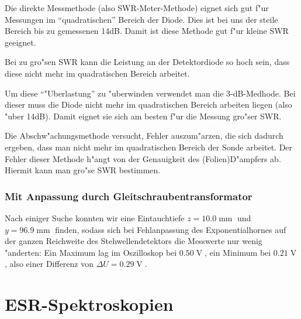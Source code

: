 \documentclass[a4paper,12pt]{article}
\begin{document}
Die direkte Messmethode (also SWR-Meter-Methode) eignet sich gut f"ur
Messungen im "`quadratischen"' Bereich der Diode. Dies ist bei uns der
steile Bereich bis zu gemessenen 14dB.
 Damit ist diese Methode gut
f"ur kleine SWR geeignet. 


Bei zu gro"sen SWR kann die Leistung an der Detektordiode so hoch
sein, dass diese nicht mehr im quadratischen Bereich arbeitet. 

Um diese "`"Uberlastung"' zu "uberwinden verwendet man die
3-dB-Medhode. 
Bei dieser muss die Diode nicht mehr
im quadratischen Bereich arbeiten liegen (also "uber 14dB). Damit
eignet sie sich am besten f"ur die Messung gro"ser SWR. 

Die Abschw"achungsmethode versucht, Fehler auszum"arzen, die sich
dadurch ergeben, dass man nicht mehr im quadratischen Bereich der
Sonde arbeitet. Der Fehler dieser Methode h"angt von der Genauigkeit
des (Folien)D"ampfers ab. Hiermit kann man gro"se SWR bestimmen.


 



\subsubsection{Mit Anpassung durch Gleitschraubentransformator}
\label{sec:mit_anpass_durch_gleitschr}

Nach einiger Suche konnten wir eine Eintauchtiefe $z =
10.0\operatorname{mm}$ und $y = 96.9\operatorname{mm}$ finden, sodass
sich bei Fehlanpassung des Exponentialhornes auf der ganzen Reichweite
des Stehwellendetektors die Messwerte nur wenig "anderten: Ein Maximum
lag im Oszilloskop bei $0.50\operatorname{V}$, ein Minimum bei
$0.21\operatorname{V}$, also einer Differenz von $\Delta U =
0.29\operatorname{V}$.

 
 
 
 





\section{ESR-Spektroskopien}
\end{document}
